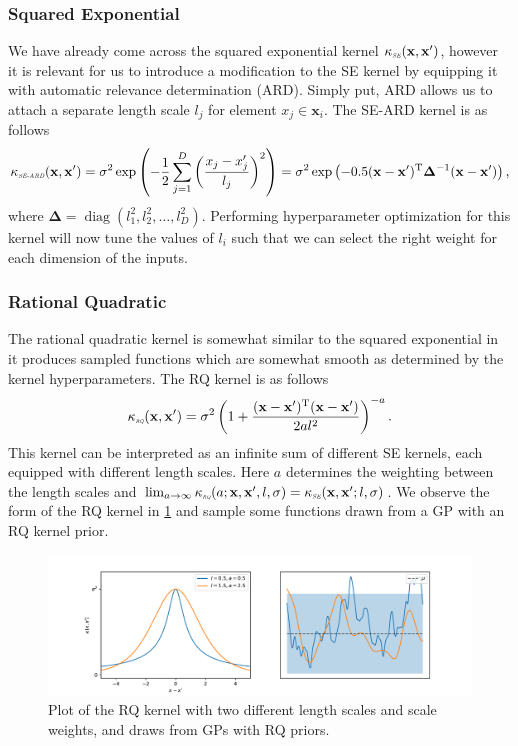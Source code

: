 \documentclass[10pt,a4paper]{article}
\DeclareMathOperator{\diag}{diag}
\numberwithin{equation}{section}
\theoremstyle{plain}
\theoremstyle{definition}
\theoremstyle{own}
\begin{document}
\subsubsection{Squared Exponential}
We have already come across the squared exponential kernel $\kappa_{\scaleto{\textit{SE}}{3pt}}(\mathbf{x}, \mathbf{x^{\prime}})$, however it is relevant for us to introduce a modification to the SE kernel by equipping it with automatic relevance determination (ARD). Simply put, ARD allows us to attach a separate length scale $l_j$ for element $x_j \in \mathbf{x}_i$. The SE-ARD kernel is as follows
\begin{equation}
\kappa_{\scaleto{\textit{SE-ARD}}{3pt}}(\mathbf{x}, \mathbf{x^{\prime}}) = \sigma^2 \exp \left( - \frac{1}{2} \sum_{j = 1}^D \left( \frac{x_j - x_j^{\prime}}{l_j} \right)^2 \right) = \sigma^2 \exp \left( -0.5 ( \mathbf{x} - \mathbf{x}^{\prime} )^{\text{T}} \boldsymbol\Delta^{-1} ( \mathbf{x} - \mathbf{x}^{\prime} ) \right),
\end{equation}
where $\boldsymbol\Delta = \diag(l_1^2, l_2^2, \ldots, l_D^2)$. Performing hyperparameter optimization for this kernel will now tune the values of $l_i$ such that we can select the right weight for each dimension of the inputs.
\subsubsection{Rational Quadratic}
The rational quadratic kernel is somewhat similar to the squared exponential in it produces sampled functions which are somewhat smooth as determined by the kernel hyperparameters. The RQ kernel is as follows
\begin{equation}
\kappa_{\scaleto{\textit{RQ}}{3pt}}(\mathbf{x}, \mathbf{x^{\prime}}) = \sigma^2 \left( 1 + \frac{( \mathbf{x} - \mathbf{x}^{\prime} )^{\text{T}}( \mathbf{x} - \mathbf{x}^{\prime} )}{2 a l^2} \right)^{-a}.
\end{equation}
This kernel can be interpreted as an infinite sum of different SE kernels, each equipped with different length scales. Here $a$ determines the weighting between the length scales and $\lim_{a \to \infty} \kappa_{\scaleto{\textit{RQ}}{3pt}}(a; \mathbf{x}, \mathbf{x^{\prime}}, l, \sigma) = \kappa_{\scaleto{\textit{SE}}{3pt}}(\mathbf{x}, \mathbf{x^{\prime}}; l, \sigma)$. We observe the form of the RQ kernel in \cref{rqdraws} and sample some functions drawn from a GP with an RQ kernel prior.
\begin{figure}
\includegraphics[width=1.0\textwidth]{rq_ker}
\caption{Plot of the RQ kernel with two different length scales and scale weights, and draws from GPs with RQ priors.}
\label{rqdraws}
\end{figure}
\end{document}
